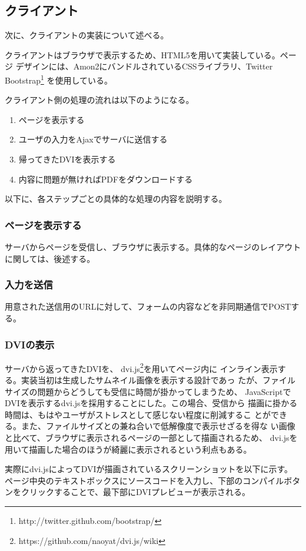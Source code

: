\documentclass[a4j,9pt,titlepage]{jsarticle}
\begin{document}
\subsection{クライアント}
次に、クライアントの実装について述べる。

クライアントはブラウザで表示するため、HTML5を用いて実装している。ページ
デザインには、Amon2にバンドルされているCSSライブラリ、Twitter
Bootstrap\footnote{http://twitter.github.com/bootstrap/}
を使用している。

クライアント側の処理の流れは以下のようになる。
\begin{enumerate}
 \item ページを表示する
 \item ユーザの入力をAjaxでサーバに送信する
 \item 帰ってきたDVIを表示する
 \item 内容に問題が無ければPDFをダウンロードする
\end{enumerate}

以下に、各ステップごとの具体的な処理の内容を説明する。

\subsubsection{ページを表示する}
サーバからページを受信し、ブラウザに表示する。具体的なページのレイアウト
に関しては、後述する。

\subsubsection{入力を送信}
用意された送信用のURLに対して、フォームの内容などを非同期通信でPOSTする。

\subsubsection{DVIの表示}
サーバから返ってきたDVIを、
dvi.js\footnote{https://github.com/naoyat/dvi.js/wiki}を用いてページ内に
インライン表示する。実装当初は生成したサムネイル画像を表示する設計であっ
たが、ファイルサイズの問題からどうしても受信に時間が掛かってしまうため、
JavaScriptでDVIを表示するdvi.jsを採用することにした。この場合、受信から
描画に掛かる時間は、もはやユーザがストレスとして感じない程度に削減するこ
とができる。また、ファイルサイズとの兼ね合いで低解像度で表示せざるを得な
い画像と比べて、ブラウザに表示されるページの一部として描画されるため、
dvi.jsを用いて描画した場合のほうが綺麗に表示されるという利点もある。

実際にdvi.jsによってDVIが描画されているスクリーンショットを以下に示す。
ページ中央のテキストボックスにソースコードを入力し、下部のコンパイルボタ
ンをクリックすることで、最下部にDVIプレビューが表示される。
\\
\end{document}
